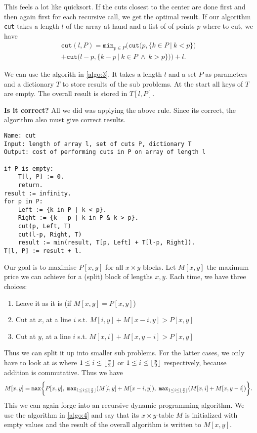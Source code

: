 \documentclass[12pt]{article}
\begin{document}
  This feels a lot like quicksort. If the cuts closest to the center are done first and then again first for each recursive call, we get the optimal result. If our algorithm \texttt{cut} takes a length $l$ of the array at hand and a list of of points $p$ where to cut, we have \begin{multline}
 	\texttt{cut}(l, P)=\texttt{min}_{p\in P}\bigg(\texttt{cut}\big(p, \{k\in P\ |\ k<p\}\big) \\
 	+\texttt{cut}\big(l-p, \{k-p\ |\ k\in P\ \land\ k>p\}\big)\bigg)+l.
 \end{multline}
 
 We can use the algorith in \autoref{algo:3}. It takes a length $l$ and a set $P$ as parameters and a dictionary $T$ to store results of the sub problems. At the start all keys of $T$ are empty. The overall result is stored in $T[l,P]$.

 \vspace{.5cm}
 \textbf{Is it correct?} All we did was applying the above rule. Since its correct, the algorithm also must give correct results.
 
\begin{lstlisting}[caption={Cutting arrays recursively},label={algo:3}]
Name: cut
Input: length of array l, set of cuts P, dictionary T
Output: cost of performing cuts in P on array of length l
 
if P is empty:
	T[l, P] := 0.
	return.
result := infinity.
for p in P:
	Left := {k in P | k < p}.
	Right := {k - p | k in P & k > p}.
	cut(p, Left, T)
	cut(l-p, Right, T)
	result := min(result, T[p, Left] + T[l-p, Right]).
T[l, P] := result + l.
\end{lstlisting}

  Our goal is to maximise $P[x,y]$ for all $x\times y$ blocks. Let $M[x,y]$ the maximum price we can achieve for a (split) block of lengths $x,y$. Each time, we have three choices: \begin{enumerate}
 	\item Leave it as it is (if $M[x,y]=P[x,y]$)
 	\item Cut at $x$, at a line $i$ s.t. $M[i,y]+M[x-i,y]>P[x,y]$
 	\item Cut at $y$, at a line $i$ s.t. $M[x,i]+M[x,y-i]>P[x,y]$
 \end{enumerate}
 Thus we can split it up into smaller sub problems. For the latter cases, we only have to look at $i$s where $1\leq i\leq\lfloor \frac{x}{2} \rfloor$ or $1\leq i\leq\lfloor \frac{y}{2} \rfloor$ respectively, because addition is commutative. Thus we have \begin{multline}
 	M[x,y]=\texttt{max}\bigg\{P[x,y],\ \texttt{max}_{1\leq i\leq\lfloor \frac{x}{2} \rfloor} (M[i,y]+M[x-i,y]),\ \texttt{max}_{1\leq i\leq\lfloor \frac{y}{2} \rfloor} (M[x,i]+M[x,y-i])\bigg\}.
 \end{multline} This we can again forge into an recursive dynamic programming algorithm. We use the algorithm in \autoref{algo:4} and say that its $x\times y$-table $M$ is initialized with empty values and the result of the overall algorithm is written to $M[x,y]$.
\end{document}
